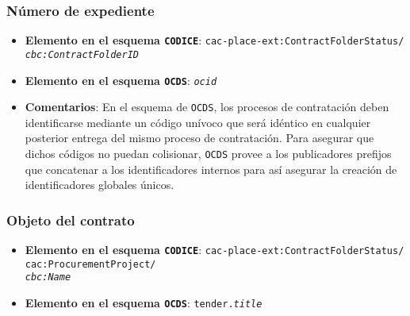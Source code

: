         \subsubsection{Número de expediente}
            \begin{itemize}
                \item \textbf{Elemento en el esquema \texttt{CODICE}}:
                    \tabto{7.6cm} \texttt{cac-place-ext:ContractFolderStatus/} \\
                    \tabto{7.6cm} \texttt{\textit{cbc:ContractFolderID}}
                \item \textbf{Elemento en el esquema \texttt{OCDS}}:
                    \tabto{7.6cm} \texttt{\textit{ocid}}
                \item \textbf{Comentarios}: En el esquema de \texttt{OCDS}, los procesos de contratación deben identificarse mediante un código unívoco que será idéntico en cualquier posterior entrega del mismo proceso de contratación. Para asegurar que dichos códigos no puedan colisionar, \texttt{OCDS} provee a los publicadores prefijos que concatenar a los identificadores internos para así asegurar la creación de identificadores globales únicos.
            \end{itemize}
        
        \subsubsection{Objeto del contrato}
            \begin{itemize}
                \item \textbf{Elemento en el esquema \texttt{CODICE}}:
                    \tabto{7.6cm} \texttt{cac-place-ext:ContractFolderStatus/} \\
                    \tabto{7.6cm} \texttt{cac:ProcurementProject/} \\
                    \tabto{7.6cm} \texttt{\textit{cbc:Name}}
                \item \textbf{Elemento en el esquema \texttt{OCDS}}:
                    \tabto{7.6cm} \texttt{tender.\textit{title}}
            \end{itemize}
        
